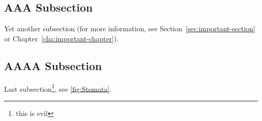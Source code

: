 \documentclass[letterpaper,12pt]{article}
\begin{document}
\subsection{AAA Subsection}
Yet another subsection (for more information, see Section~\ref{sec:important-section} or Chapter~\ref{cha:important-chapter}).

\subsection{AAAA Subsection}
Last subsection\footnote{this is evil}, see \ref{fig:Stomata}.


% 
% 
% 
% 

% 




\end{document}
